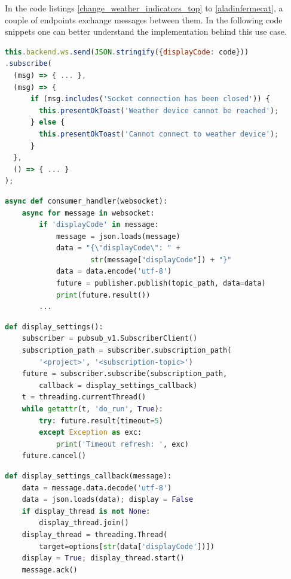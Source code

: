 In the code listings \ref{change_weather_indicators_top} to \ref{aladinfermecat}, a couple of endpoints exchange messages between them. In the following code snippets one can better understand the implementation behind this use case.

\begin{lstlisting}[language=JavaScript, caption=User Application Layer (Ionic Application - Monitor Page), label=change_weather_indicators_top]
this.backend.ws.send(JSON.stringify({displayCode: code}))
.subscribe(
  (msg) => { ... },
  (msg) => {
      if (msg.includes('Socket connection has been closed')) {
        this.presentOkToast('Weather device cannot be reached');
      } else {
        this.presentOkToast('Cannot connect to weather device');
      }
  },
  () => { ... }
);
\end{lstlisting}

\begin{lstlisting}[language=Python, caption=Reasoning Layer (Digital Ocean instance running 'ws\_consumer.py'), label=change_weather_indicators_reasoning]
async def consumer_handler(websocket):
    async for message in websocket:
        if 'displayCode' in message:
            message = json.loads(message)
            data = "{\"displayCode\": " + 
                    str(message["displayCode"]) + "}"
            data = data.encode('utf-8')
            future = publisher.publish(topic_path, data=data)
            print(future.result())
        ...
\end{lstlisting}

\begin{lstlisting}[language=Python, caption=IoT Data Sensing Layer: 1 (Raspberry Pi running 'weather\_monitor.py')]
def display_settings():
    subscriber = pubsub_v1.SubscriberClient()
    subscription_path = subscriber.subscription_path(
        '<project>', '<subscription-topic>')
    future = subscriber.subscribe(subscription_path, 
        callback = display_settings_callback)
    t = threading.currentThread()
    while getattr(t, 'do_run', True):
        try: future.result(timeout=5)
        except Exception as exc:
            print('Timeout refresh: ', exc)
    future.cancel()
\end{lstlisting}

\begin{lstlisting}[language=Python, caption=IoT Data Sensing Layer: 2 (Open a new thread for light display execution sequence)]
def display_settings_callback(message):
    data = message.data.decode('utf-8')
    data = json.loads(data); display = False
    if display_thread is not None:
        display_thread.join()
    display_thread = threading.Thread(
        target=options[str(data['displayCode'])])
    display = True; display_thread.start()
    message.ack()
\end{lstlisting}

